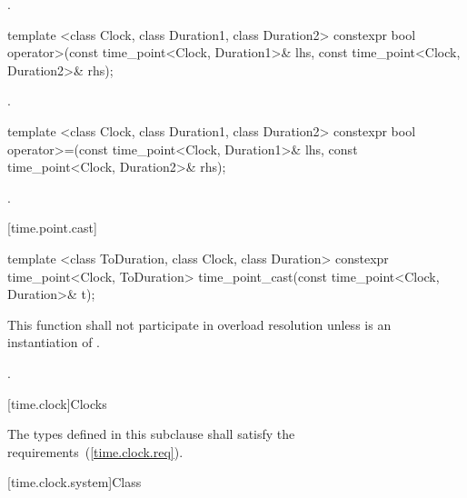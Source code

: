 \begin{itemdescr}
\pnum
\returns {}.
\end{itemdescr}

%
%
\begin{itemdecl}
template <class Clock, class Duration1, class Duration2>
  constexpr bool operator>(const time_point<Clock, Duration1>& lhs, const time_point<Clock, Duration2>& rhs);
\end{itemdecl}

\begin{itemdescr}
\pnum
\returns {}.
\end{itemdescr}

%
%
\begin{itemdecl}
template <class Clock, class Duration1, class Duration2>
  constexpr bool operator>=(const time_point<Clock, Duration1>& lhs, const time_point<Clock, Duration2>& rhs);
\end{itemdecl}

\begin{itemdescr}
\pnum
\returns {}.
\end{itemdescr}

[time.point.cast]{}

%
\begin{itemdecl}
template <class ToDuration, class Clock, class Duration>
  constexpr time_point<Clock, ToDuration>
  time_point_cast(const time_point<Clock, Duration>& t);
\end{itemdecl}

\begin{itemdescr}
\pnum
\remarks This function shall not participate in overload
resolution unless  is an
instantiation of .

\pnum
\returns {}.
\end{itemdescr}

[time.clock]{Clocks}

\pnum
The types defined in this subclause shall satisfy the
requirements~(\ref{time.clock.req}).

[time.clock.system]{Class }

